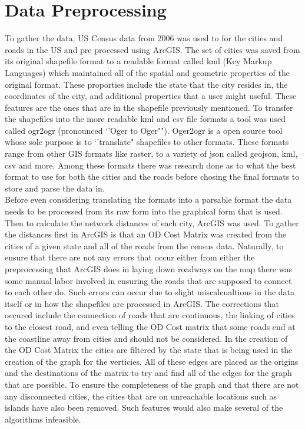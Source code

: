 \documentclass[midd]{thesis}
\newcommand{\tab}{\hspace*{2em}}
\begin{document}
\section{Data Preprocessing}
\tab To gather the data, US Census data from 2006 was used to for the cities and roads in the US and pre processed using ArcGIS. The set of cities was saved from its original shapefile format to a readable format called kml (Key Markup Languages) which maintained all of the spatial and geometric properties of the original format. These proporties include the state that the city resides in, the coordinates of the city, and additional properties that a user might useful. These features are the ones that are in the shapefile previously mentioned. To transfer the shapefiles into the more readable kml and csv file formats a tool was used called ogr2ogr (pronounced `'Oger to Oger""). Oger2ogr is a open source tool whose sole purpose is to `'translate" shapefiles to other formats. These formats range from other GIS formats like raster, to a variety of json called geojson, kml, csv and more. Among these formats there was research done as to what the best format to use for both the cities and the roads before chosing the final formats to store and parse the data in.\\
\tab Before even considering translating the formats into a parsable format the data needs to be processed from its raw form into the graphical form that is used. Then to calculate the network distances of each city, ArcGIS was used. To gather the distances first in ArcGIS is that an OD Cost Matrix was created from the cities of a given state and all of the roads from the census data. Naturally, to ensure that there are not any errors that occur either from either the preprocessing that ArcGIS does in laying down roadways on the map there was some manual labor involved in ensuring the roads that are supposed to connect to each other do. Such errors can occur due to slight miscalcualtions in the data itself or in how the shapefiles are processed in ArcGIS. The corrections that occured include the connection of roads that are continuous, the linking of cities to the closest road, and even telling the OD Cost matrix that  some roads end at the coastline away from cities and should not be considered. In the creation of the OD Cost Matrix the cities are filtered by the state that is being used in the creation of the graph for the verticies. All of these edges are placed as the origins and the destinations of the matrix to try and find all of the edges for the graph that are possible. To ensure the completeness of the graph and that there are not any disconnected cities, the cities that are on unreachable locations such as islands have also been removed. Such features would also make several of the algorithms infeasible.\\
\end{document}
